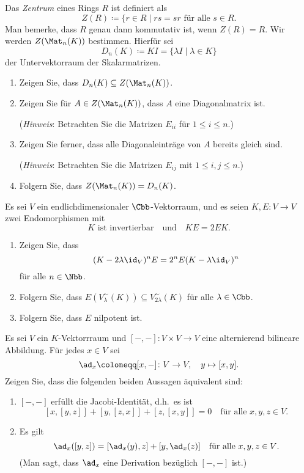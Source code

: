 \begin{question}
  Das \emph{Zentrum} eines Rings $R$ ist definiert als
  \[
    Z(R) \coloneqq \{r \in R \mid \text{$rs = sr$ für alle $s \in R$}.
  \]
  Man bemerke, dass $R$ genau dann kommutativ ist, wenn $Z(R) = R$.
  Wir werden $Z(\Mat_n(K))$ bestimmen.
  Hierfür sei
  \[
    D_n(K) \coloneqq K I = \{\lambda I \mid \lambda \in K\}
  \]
  der Untervektorraum der Skalarmatrizen.
  \begin{enumerate}[leftmargin=*]
    \item
      Zeigen Sie, dass $D_n(K) \subseteq Z(\Mat_n(K))$.
    \item
      Zeigen Sie für $A \in Z(\Mat_n(K))$, dass $A$ eine Diagonalmatrix ist.
      
      (\emph{Hinweis}:
       Betrachten Sie die Matrizen $E_{ii}$ für $1 \leq i \leq n$.)
    \item
      Zeigen Sie ferner, dass alle Diagonaleinträge von $A$ bereits gleich sind.
      
      (\emph{Hinweis}:
       Betrachten Sie die Matrizen $E_{ij}$ mit $1 \leq i,j \leq n$.)
    \item
      Folgern Sie, dass $Z(\Mat_n(K)) = D_n(K)$.
  \end{enumerate}
\end{question}


\begin{question}
  Es sei $V$ ein endlichdimensionaler $\Cbb$-Vektorraum, und es seien $K, E \colon V \to V$ zwei Endomorphismen mit
  \[
    \text{$K$ ist invertierbar}
    \quad\text{und}\quad
    KE = 2EK.
  \]
  \begin{enumerate}[leftmargin=*]
    \item
      Zeigen Sie, dass
      \[
        (K - 2 \lambda \id_V)^n E = 2^n E (K - \lambda \id_V)^n
      \]
      für alle $n \in \Nbb$.
    \item
      Folgern Sie, dass $E( V^\sim_\lambda(K) ) \subseteq V^\sim_{2\lambda}(K)$ für alle $\lambda \in \Cbb$.
    \item
      Folgern Sie, dass $E$ nilpotent ist.
  \end{enumerate}
\end{question}


\begin{question}
  Es sei $V$ ein $K$-Vektorrraum und $[-,-] \colon V \times V \to V$ eine alternierend bilineare Abbildung.
  Für jedes $x \in V$ sei
  \[
    \ad_x \coloneqq [x,-] \colon V \to V, \quad y \mapsto [x,y].
  \]
  Zeigen Sie, dass die folgenden beiden Aussagen äquivalent sind:
  \begin{enumerate}
    \item
      $[-,-]$ erfüllt die Jacobi-Identität, d.h.\ es ist
      \[
        [x,[y,z]] + [y,[z,x]] + [z,[x,y]] = 0
        \quad
        \text{für alle $x, y, z \in V$}.
      \]
    \item
      Es gilt
      \[
          \ad_x([y,z])
        = [\ad_x(y), z] + [y, \ad_x(z)]
        \quad
        \text{für alle $x, y, z \in V$}.
      \]
      (Man sagt, dass $\ad_x$ eine Derivation bezüglich $[-,-]$ ist.)
  \end{enumerate}
\end{question}


